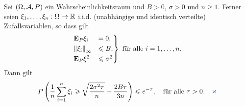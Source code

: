 \begin{prop}
\label{prop:3.3}
Sei $(\Omega,\AA,P)$ ein Wahrscheinlichkeitsraum und $B>0$, $\sigma > 0$ und
$n\ge 1$. Ferner seien $\xi_1,\ldots,\xi_n: \Omega\to\R$ i.i.d. (unabhängige und
identisch verteilte) Zufallsvariablen, so dass gilt
\begin{align*}
\begin{rcases}
\E_P \xi_i &= 0,\\
\norm{\xi_i}_\infty &\le B,\\
\E_P \xi^2 &\le \sigma^2
\end{rcases}
\text{ für alle } i = 1,\ldots,n.
\end{align*}
Dann gilt
\begin{align*}
P\left(\frac{1}{n} \sum_{i=1}^n \xi_i \ge \sqrt{\frac{2\sigma^2\tau}{n}} +
\frac{2 B \tau}{3n}\right) \le e^{-\tau},\quad \text{für alle } \tau >
0.\fishhere
\end{align*}
\end{prop}
